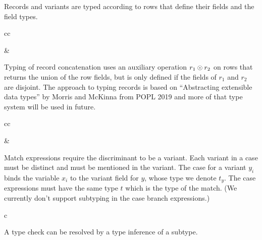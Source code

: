 \documentclass[11pt]{article}
\begin{document}
Records and variants are typed according to rows that define their fields and the field types.

\begin{rules}{cc}


&


\end{rules}

Typing of record concatenation uses an auxiliary operation $r_1 \odot r_2$ on rows that returns the union of the row fields, but is only defined if the fields of $r_1$ and $r_2$ are disjoint.
The approach to typing records is based on ``Abstracting extensible data types'' by Morris and McKinna from POPL 2019 and more of that type system will be used in future.

\begin{rules}{cc}


&


\end{rules}

Match expressions require the discriminant to be a variant.
Each variant in a case must be distinct and must be mentioned in the variant.
The case for a variant $y_i$ binds the variable $x_i$ to the variant field for $y$,
whose type we denote $t_y$.
The case expressions must have the same type $t$ which is the type of the match.
(We currently don't support subtyping in the case branch expressions.)

\begin{rules}{c}


\end{rules}

A type check can be resolved by a type inference of a subtype.
\end{document}
